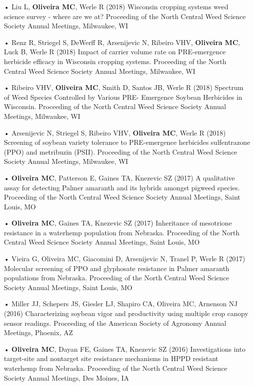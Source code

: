 \documentclass[11pt,]{article}
\begin{document}
• Liu L, \textbf{Oliveira MC}, Werle R (2018) Wisconsin cropping systems
weed science survey - where are we at? Proceeding of the North Central
Weed Science Society Annual Meetings, Milwaukee, WI

• Renz R, Striegel S, DeWerff R, Arsenijevic N, Ribeiro VHV,
\textbf{Oliveira MC}, Luck B, Werle R (2018) Impact of carrier volume
rate on PRE-emergence herbicide efficacy in Wisconsin cropping systems.
Proceeding of the North Central Weed Science Society Annual Meetings,
Milwaukee, WI

• Ribeiro VHV, \textbf{Oliveira MC}, Smith D, Santos JB, Werle R (2018)
Spectrum of Weed Species Controlled by Various PRE- Emergence Soybean
Herbicides in Wisconsin. Proceeding of the North Central Weed Science
Society Annual Meetings, Milwaukee, WI

• Arsenijevic N, Striegel S, Ribeiro VHV, \textbf{Oliveira MC}, Werle R
(2018) Screening of soybean variety tolerance to PRE-emergence
herbicides sulfentrazone (PPO) and metribuzin (PSII). Proceeding of the
North Central Weed Science Society Annual Meetings, Milwaukee, WI

• \textbf{Oliveira MC}, Patterson E, Gaines TA, Knezevic SZ (2017) A
qualitative assay for detecting Palmer amaranth and its hybrids amongst
pigweed species. Proceeding of the North Central Weed Science Society
Annual Meetings, Saint Louis, MO

• \textbf{Oliveira MC}, Gaines TA, Knezevic SZ (2017) Inheritance of
mesotrione resistance in a waterhemp population from Nebraska.
Proceeding of the North Central Weed Science Society Annual Meetings,
Saint Louis, MO

• Vieira G, Oliveira MC, Giacomini D, Arsenijevic N, Tranel P, Werle R
(2017) Molecular screening of PPO and glyphosate resistance in Palmer
amaranth populations from Nebraska. Proceeding of the North Central Weed
Science Society Annual Meetings, Saint Louis, MO

• Miller JJ, Schepers JS, Giesler LJ, Shapiro CA, Oliveira MC, Arnenson
NJ (2016) Characterizing soybean vigor and productivity using multiple
crop canopy sensor readings. Proceeding of the American Society of
Agronomy Annual Meetings, Phoenix, AZ

• \textbf{Oliveira MC}, Dayan FE, Gaines TA, Knezevic SZ (2016)
Investigations into target-site and nontarget site resistance mechanisms
in HPPD resistant waterhemp from Nebraska. Proceeding of the North
Central Weed Science Society Annual Meetings, Des Moines, IA
\end{document}
